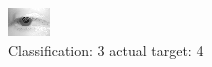 \begin{figure}[h!]
\begin{center}
\includegraphics[width=0.60\columnwidth]{figures/ID2696_class_3_target_4.png}
\end{center}
\caption{ Classification: 3 actual target: 4}
\label{fig:ID2696_class_3_target_4}
\end{figure}
